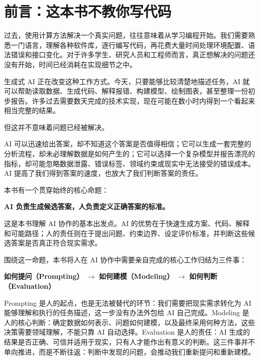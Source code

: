 \chapter*{前言：这本书不教你写代码}

过去，使用计算方法解决一个真实问题，往往意味着从学习编程开始。我们需要熟悉一门语言，理解各种软件库，逐行编写代码，再花费大量时间处理环境配置、语法错误和接口变化。对于许多学生、研究人员和工程师而言，真正想解决的问题还没有开始，时间已经消耗在实现细节之中。

生成式 AI 正在改变这种工作方式。今天，只要能够比较清楚地描述任务，AI 就可以帮助读取数据、生成代码、解释报错、构建模型、绘制图表，甚至整理一份初步报告。许多过去需要数天完成的技术实现，现在可能在数小时内得到一个看起来相当完整的结果。

但这并不意味着问题已经被解决。

AI 可以迅速给出答案，却不知道这个答案是否值得相信；它可以生成一套完整的分析流程，却未必理解数据是如何产生的；它可以选择一个复杂模型并报告漂亮的指标，却可能忽略数据泄露、错误标签、领域约束或现实中无法接受的错误成本。AI 提高了我们得到答案的速度，也放大了我们判断答案的责任。

本书有一个贯穿始终的核心命题：

\begin{center}
\textbf{AI 负责生成候选答案，人负责定义正确答案的标准。}
\end{center}

这是本书理解 AI 协作的基本出发点。AI 的优势在于快速生成方案、代码、解释和可能路径；人的责任则在于提出问题、约束边界、设定评价标准，并判断这些候选答案是否真正符合现实需求。

围绕这一命题，本书将人在 AI 协作中需要亲自完成的核心工作归结为三件事：

\begin{center}
\textbf{如何提问（Prompting）}
$\longrightarrow$
\textbf{如何建模（Modeling）}
$\longrightarrow$
\textbf{如何判断（Evaluation）}
\end{center}

Prompting 是人的起点，也是无法被替代的环节：我们需要把现实需求转化为 AI 能够理解和执行的任务描述，这一步没有办法外包给 AI 自己完成。Modeling 是人的核心判断：确定数据如何表示、问题如何建模，以及最终采用何种方法，这些决策需要领域理解，不能只靠 AI 自动选择。Evaluation 是人的责任：AI 生成的结果是否正确、可信并适用于现实，只有人才能作出有意义的判断。这三件事并不单向推进，而是不断往返：判断中发现的问题，会推动我们重新提问和重新建模。

